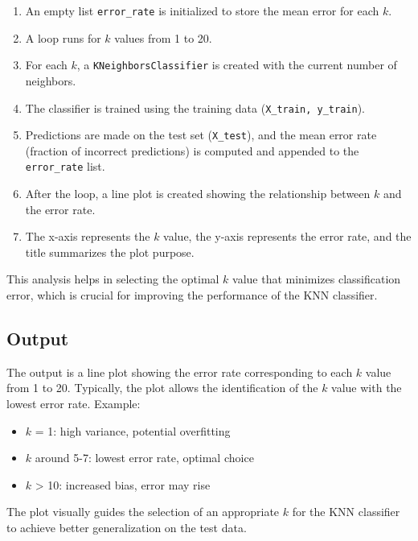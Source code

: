 \documentclass[11pt]{article}
\begin{document}
\begin{enumerate}
    \item An empty list \texttt{error\_rate} is initialized to store the mean error for each $k$.
    \item A loop runs for $k$ values from 1 to 20.
    \item For each $k$, a \texttt{KNeighborsClassifier} is created with the current number of neighbors.
    \item The classifier is trained using the training data (\texttt{X\_train, y\_train}).
    \item Predictions are made on the test set (\texttt{X\_test}), and the mean error rate (fraction of incorrect predictions) is computed and appended to the \texttt{error\_rate} list.
    \item After the loop, a line plot is created showing the relationship between $k$ and the error rate.
    \item The x-axis represents the $k$ value, the y-axis represents the error rate, and the title summarizes the plot purpose.
\end{enumerate}

This analysis helps in selecting the optimal $k$ value that minimizes classification error, which is crucial for improving the performance of the KNN classifier.

\subsection*{Output}
The output is a line plot showing the error rate corresponding to each $k$ value from 1 to 20. Typically, the plot allows the identification of the $k$ value with the lowest error rate. Example:

\begin{itemize}
    \item $k$ = 1: high variance, potential overfitting
    \item $k$ around 5-7: lowest error rate, optimal choice
    \item $k$ > 10: increased bias, error may rise
\end{itemize}

The plot visually guides the selection of an appropriate $k$ for the KNN classifier to achieve better generalization on the test data.

    \begin{center}
    \end{center}
    { \hspace*{\fill} \\}
    \newpage
    
\end{document}
